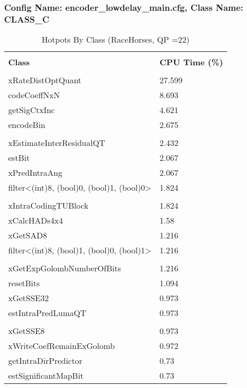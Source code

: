\documentclass{article}%
\begin{document}
\subsubsection{Config Name: encoder\_lowdelay\_main.cfg, Class Name: CLASS\_C}%
\label{ssubsec:ConfigNameencoderlowdelaymain.cfg,ClassNameCLASSC}%
\begin{longtabu}{| X[l] | X[l] |}%
\caption{%
Hotpots By Class (RaceHorses, QP =22)%
}%
\hline%
&\\%
\textbf{Class}&\textbf{CPU Time (\%)}\\%
&\\%
\hline%
\endhead%
xRateDistOptQuant&27.599\\%
\hline%
codeCoeffNxN&8.693\\%
\hline%
getSigCtxInc&4.621\\%
\hline%
encodeBin&2.675\\%
\hline%
&\\%
\hline%
xEstimateInterResidualQT&2.432\\%
\hline%
estBit&2.067\\%
\hline%
xPredIntraAng&2.067\\%
\hline%
filter<(int)8, (bool)0, (bool)1, (bool)0>&1.824\\%
\hline%
&\\%
\hline%
xIntraCodingTUBlock&1.824\\%
\hline%
xCalcHADs4x4&1.58\\%
\hline%
xGetSAD8&1.216\\%
\hline%
filter<(int)8, (bool)1, (bool)0, (bool)1>&1.216\\%
\hline%
&\\%
\hline%
xGetExpGolombNumberOfBits&1.216\\%
\hline%
resetBits&1.094\\%
\hline%
xGetSSE32&0.973\\%
\hline%
estIntraPredLumaQT&0.973\\%
\hline%
&\\%
\hline%
xGetSSE8&0.973\\%
\hline%
xWriteCoefRemainExGolomb&0.972\\%
\hline%
getIntraDirPredictor&0.73\\%
\hline%
estSignificantMapBit&0.73\\%
\hline%
\end{longtabu}%
\newpage%
\end{document}
